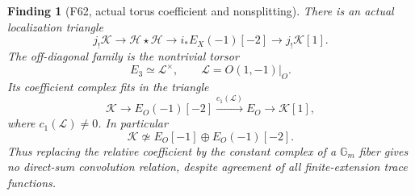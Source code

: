\documentclass[11pt,a4paper]{article}
\newcommand{\fid}[1]{\textsf{#1}}\newcommand{\gate}[1]{\textsf{#1}}
\theoremstyle{named}\newtheorem{finding}{Finding}[section]
\theoremstyle{definition}\newtheorem{definition}[finding]{Definition}
\theoremstyle{remark}\newtheorem{remark}[finding]{Remark}
\begin{document}
\begin{finding}[\fid{F62}, actual torus coefficient and nonsplitting]
\label{f:nonpropertorus}
There is an actual localization triangle
\begin{equation}\label{eq:flagopenclosedrelation}
 j_!\mathcal K\longrightarrow
 \mathcal H\star\mathcal H\longrightarrow
 i_*E_X(-1)[-2]\longrightarrow j_!\mathcal K[1].
\end{equation}
The off-diagonal family is the nontrivial torsor
\[
 E_3\simeq\mathcal L^\times,\qquad
                  \mathcal L=O(1,-1)|_O.
\]
Its coefficient complex fits in the triangle
\begin{equation}\label{eq:torusCherntriangle}
 \mathcal K\longrightarrow E_O(-1)[-2]
   \xrightarrow{c_1(\mathcal L)} E_O
   \longrightarrow\mathcal K[1],
\end{equation}
where \(c_1(\mathcal L)\ne0\).
In particular
\[
 \mathcal K\not\simeq E_O[-1]\oplus E_O(-1)[-2].
\]
Thus replacing the relative coefficient by the constant
complex of a \(\mathbb G_m\) fiber gives no direct-sum
convolution relation, despite agreement of all finite-extension
trace functions.
\end{finding}
\end{document}
